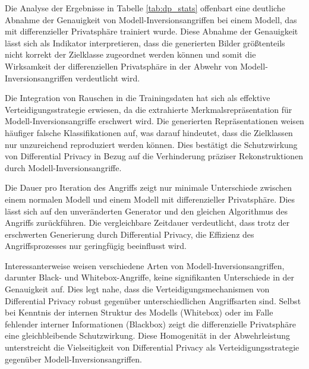 Die Analyse der Ergebnisse in Tabelle \ref{tab:dp_stats} offenbart eine deutliche Abnahme der Genauigkeit von Modell-Inversionsangriffen bei einem Modell, das mit differenzieller Privatsphäre trainiert wurde. Diese Abnahme der Genauigkeit lässt sich als Indikator interpretieren, dass die generierten Bilder größtenteils nicht korrekt der Zielklasse zugeordnet werden können und somit die Wirksamkeit der differenziellen Privatsphäre in der Abwehr von Modell-Inversionsangriffen verdeutlicht wird.

Die Integration von Rauschen in die Trainingsdaten hat sich als effektive Verteidigungsstrategie erwiesen, da die extrahierte Merkmalsrepräsentation für Modell-Inversionsangriffe erschwert wird. Die generierten Repräsentationen weisen häufiger falsche Klassifikationen auf, was darauf hindeutet, dass die Zielklassen nur unzureichend reproduziert werden können. Dies bestätigt die Schutzwirkung von Differential Privacy in Bezug auf die Verhinderung präziser Rekonstruktionen durch Modell-Inversionsangriffe.

Die Dauer pro Iteration des Angriffs zeigt nur minimale Unterschiede zwischen einem normalen Modell und einem Modell mit differenzieller Privatsphäre. Dies lässt sich auf den unveränderten Generator und den gleichen Algorithmus des Angriffs zurückführen. Die vergleichbare Zeitdauer verdeutlicht, dass trotz der erschwerten Generierung durch Differential Privacy, die Effizienz des Angriffsprozesses nur geringfügig beeinflusst wird.

Interessanterweise weisen verschiedene Arten von Modell-Inversionsangriffen, darunter Black- und Whitebox-Angriffe, keine signifikanten Unterschiede in der Genauigkeit auf. Dies legt nahe, dass die Verteidigungsmechanismen von Differential Privacy robust gegenüber unterschiedlichen Angriffsarten sind. Selbst bei Kenntnis der internen Struktur des Modells (Whitebox) oder im Falle fehlender interner Informationen (Blackbox) zeigt die differenzielle Privatsphäre eine gleichbleibende Schutzwirkung. Diese Homogenität in der Abwehrleistung unterstreicht die Vielseitigkeit von Differential Privacy als Verteidigungsstrategie gegenüber Modell-Inversionsangriffen.

